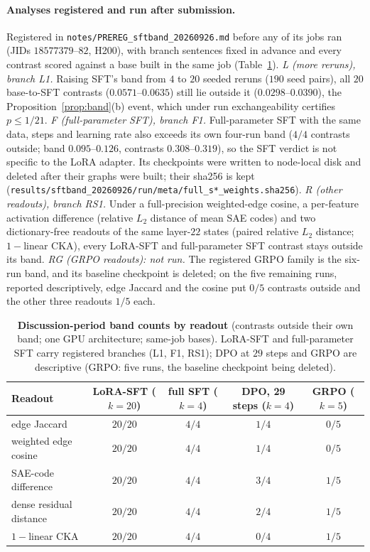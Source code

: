 \documentclass{article}
\begin{document}
\paragraph{Analyses registered and run after submission.} Registered in \texttt{notes/PREREG\_sftband\_20260926.md} before any of its jobs ran (JIDs $18577379$--$82$, H200), with branch sentences fixed in advance and every contrast scored against a base built in the same job (Table~\ref{tab:readouts}). \emph{L (more reruns), branch L1.} Raising SFT's band from $4$ to $20$ seeded reruns ($190$ seed pairs), all $20$ base-to-SFT contrasts ($0.0571$--$0.0635$) still lie outside it ($0.0298$--$0.0390$), the Proposition~\ref{prop:band}(b) event, which under run exchangeability certifies $p\le1/21$. \emph{F (full-parameter SFT), branch F1.} Full-parameter SFT with the same data, steps and learning rate also exceeds its own four-run band ($4/4$ contrasts outside; band $0.095$--$0.126$, contrasts $0.308$--$0.319$), so the SFT verdict is not specific to the LoRA adapter. Its checkpoints were written to node-local disk and deleted after their graphs were built; their sha256 is kept (\texttt{results/sftband\_20260926/run/meta/full\_s*\_weights.sha256}). \emph{R (other readouts), branch RS1.} Under a full-precision weighted-edge cosine, a per-feature activation difference (relative $L_2$ distance of mean SAE codes) and two dictionary-free readouts of the same layer-$22$ states (paired relative $L_2$ distance; $1-$linear CKA), every LoRA-SFT and full-parameter SFT contrast stays outside its band. \emph{RG (GRPO readouts): not run.} The registered GRPO family is the six-run band, and its baseline checkpoint is deleted; on the five remaining runs, reported descriptively, edge Jaccard and the cosine put $0/5$ contrasts outside and the other three readouts $1/5$ each.

\begin{table}[h]
\centering
\caption{\textbf{Discussion-period band counts by readout} (contrasts outside their own band; one GPU architecture; same-job bases). LoRA-SFT and full-parameter SFT carry registered branches (L1, F1, RS1); DPO at $29$ steps and GRPO are descriptive (GRPO: five runs, the baseline checkpoint being deleted).}
\label{tab:readouts}
\small
\begin{tabular}{lcccc}
\toprule
Readout & LoRA-SFT ($k{=}20$) & full SFT ($k{=}4$) & DPO, 29 steps ($k{=}4$) & GRPO ($k{=}5$) \\
\midrule
edge Jaccard & $20/20$ & $4/4$ & $1/4$ & $0/5$ \\
weighted edge cosine & $20/20$ & $4/4$ & $1/4$ & $0/5$ \\
SAE-code difference & $20/20$ & $4/4$ & $3/4$ & $1/5$ \\
dense residual distance & $20/20$ & $4/4$ & $2/4$ & $1/5$ \\
$1-$linear CKA & $20/20$ & $4/4$ & $0/4$ & $1/5$ \\
\bottomrule
\end{tabular}
\end{table}
\end{document}
